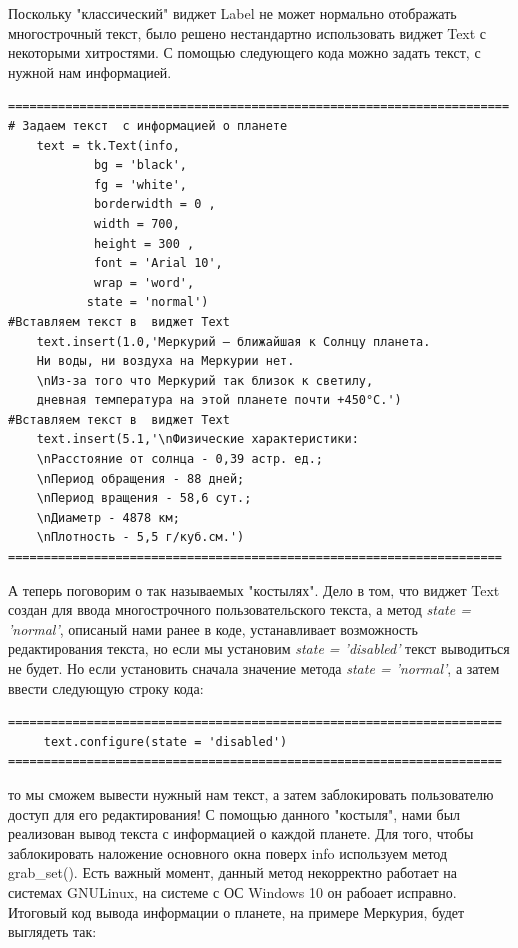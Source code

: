 \documentclass[11pt,a4paper]{report}
\begin{document}
Поскольку "классический" виджет Label не может нормально отображать многострочный текст, было решено нестандартно использовать виджет Text с некоторыми хитростями. 
С помощью следующего кода можно задать текст, с нужной нам информацией. 
\begin{verbatim}
======================================================================
# Задаем текст  с информацией о планете
    text = tk.Text(info,
            bg = 'black',
            fg = 'white',
            borderwidth = 0 ,
            width = 700, 
            height = 300 , 
            font = 'Arial 10', 
            wrap = 'word', 
           state = 'normal')
#Вставляем текст в  виджет Text    
    text.insert(1.0,'Меркурий — ближайшая к Солнцу планета. 
    Ни воды, ни воздуха на Меркурии нет. 
    \nИз-за того что Меркурий так близок к светилу,
    дневная температура на этой планете почти +450°С.')
#Вставляем текст в  виджет Text        
    text.insert(5.1,'\nФизические характеристики:
    \nРасстояние от солнца - 0,39 астр. ед.;
    \nПериод обращения - 88 дней;
    \nПериод вращения - 58,6 сут.;
    \nДиаметр - 4878 км;
    \nПлотность - 5,5 г/куб.см.')
=====================================================================
\end{verbatim}
 А теперь поговорим о так называемых "костылях". Дело в том, что виджет Text создан для ввода многострочного пользовательского текста, а метод \textit{state = 'normal'}, описаный нами ранее в коде, устанавливает возможность редактирования текста, но если мы установим \textit{state = 'disabled'} текст выводиться не будет. Но если установить сначала значение метода  \textit{state = 'normal'}, а затем ввести следующую строку кода:
 \begin{verbatim}
=====================================================================
     text.configure(state = 'disabled')
=====================================================================
 \end{verbatim}
то мы сможем вывести нужный нам текст, а затем заблокировать пользователю доступ для его редактирования!
С помощью данного "костыля", нами был реализован вывод текста с информацией о каждой планете.
Для того, чтобы заблокировать наложение основного окна поверх info используем метод grab\_set().
Есть важный момент, данный метод некорректно работает на системах GNU\/Linux, на системе с ОС Windows 10 он рабоает исправно.
\newpage
Итоговый код вывода информации о планете, на примере Меркурия, будет выглядеть так:
\end{document}
